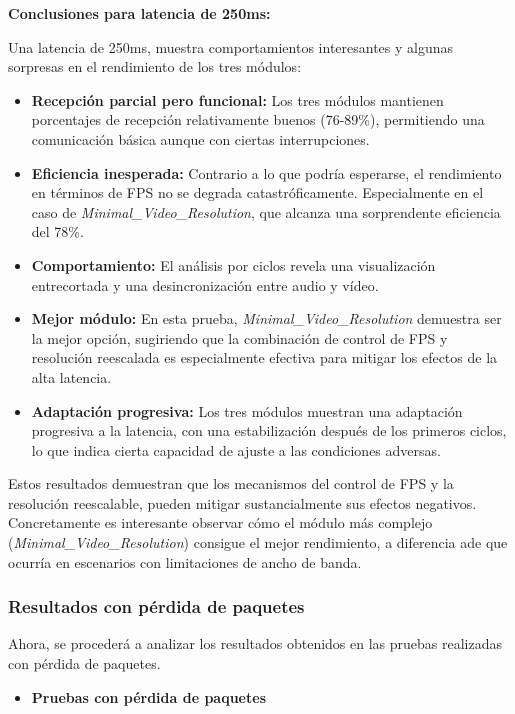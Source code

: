 \textbf{Conclusiones para latencia de 250ms:}

Una latencia de 250ms, muestra comportamientos interesantes y algunas sorpresas en el rendimiento de los tres módulos:

\begin{itemize}
    \item \textbf{Recepción parcial pero funcional:} Los tres módulos mantienen porcentajes de recepción relativamente buenos (76-89\%), permitiendo una comunicación básica aunque con ciertas interrupciones.
    
    \item \textbf{Eficiencia inesperada:} Contrario a lo que podría esperarse, el rendimiento en términos de FPS no se degrada catastróficamente. Especialmente en el caso de \textit{Minimal\_Video\_Resolution}, que alcanza una sorprendente eficiencia del 78\%.
    
    \item \textbf{Comportamiento:} El análisis por ciclos revela una visualización entrecortada y una desincronización entre audio y vídeo.
    
    \item \textbf{Mejor módulo:} En esta prueba, \textit{Minimal\_Video\_Resolution} demuestra ser la mejor opción, sugiriendo que la combinación de control de FPS y resolución reescalada es especialmente efectiva para mitigar los efectos de la alta latencia.
    
    \item \textbf{Adaptación progresiva:} Los tres módulos muestran una adaptación progresiva a la latencia, con una estabilización después de los primeros ciclos, lo que indica cierta capacidad de ajuste a las condiciones adversas.
\end{itemize}

Estos resultados demuestran que los mecanismos del control de FPS y la resolución reescalable, pueden mitigar sustancialmente sus efectos negativos. Concretamente es interesante observar cómo el módulo más complejo (\textit{Minimal\_Video\_Resolution}) consigue el mejor rendimiento, a diferencia ade que ocurría en escenarios con limitaciones de ancho de banda.

\newpage

\subsubsection{Resultados con pérdida de paquetes}

Ahora, se procederá a analizar los resultados obtenidos en las pruebas realizadas con pérdida de paquetes. 
\vspace{\baselineskip}
\begin{itemize}
  \item \textbf{Pruebas con pérdida de paquetes}
\end{itemize}

